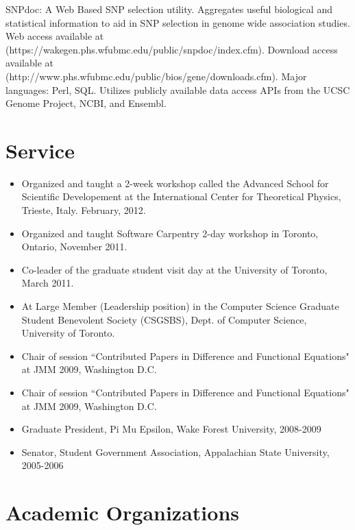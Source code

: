 \documentclass[overlapped,line,letterpaper]{res}
\begin{document}
\begin{resume}
[1] SNPdoc: A Web Based SNP selection utility.  Aggregates useful biological and statistical information to aid in SNP selection in genome wide association studies.  Web access available at (https://wakegen.phs.wfubmc.edu/public/snpdoc/index.cfm).  Download access available at \\ (http://www.phs.wfubmc.edu/public/bios/gene/downloads.cfm).  Major languages: Perl, SQL. Utilizes publicly available data access APIs from the UCSC Genome Project, NCBI, and Ensembl.

\section{\bf Service}

\begin{itemize}
\item Organized and taught a 2-week workshop called the Advanced School for Scientific Developement at the International Center for Theoretical Physics, Trieste, Italy. February, 2012.
\item Organized and taught Software Carpentry 2-day workshop in Toronto, Ontario, November 2011.
\item Co-leader of the graduate student visit day at the University of Toronto, March 2011. 
\item At Large Member (Leadership position) in the Computer Science Graduate Student Benevolent Society (CSGSBS), Dept. of Computer Science, University of Toronto.
\item Chair of session ``Contributed Papers in Difference and Functional Equations" at JMM 2009, Washington D.C.
\item Chair of session ``Contributed Papers in Difference and Functional Equations" at JMM 2009, Washington D.C.
\item Graduate President, Pi Mu Epsilon, Wake Forest University, 2008-2009
\item Senator, Student Government Association, Appalachian State University, 2005-2006
\end{itemize}





\section{\bf Academic Organizations}


\end{resume}
\end{document}
